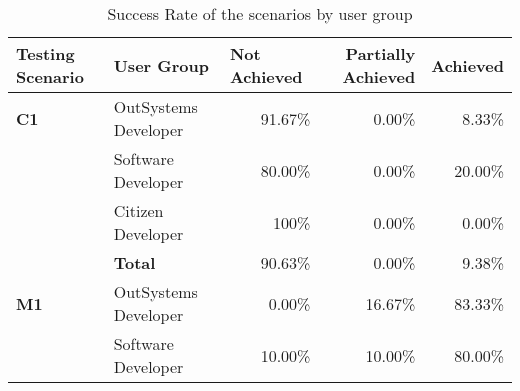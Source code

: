 \begin{table}[tb]
    \caption{Success Rate of the scenarios by user group}
    \label{tab:effectiveness_existing_interface}
    \begin{tabular}{@{}llrrr@{}}
    \toprule
    \rowcolor[HTML]{EFEFEF} 
    \textbf{Testing Scenario} & \textbf{User Group}  & \multicolumn{1}{l}{\cellcolor[HTML]{EFEFEF}\textbf{Not Achieved}} & \multicolumn{1}{C{2cm}}{\cellcolor[HTML]{EFEFEF}\textbf{Partially Achieved}} & \multicolumn{1}{l}{\cellcolor[HTML]{EFEFEF}\textbf{Achieved}} \\ \midrule
    \textbf{C1}               & OutSystems Developer & 91.67\%                                                           & 0.00\%                                                                  & 8.33\%                                                        \\
                              & Software Developer   & 80.00\%                                                           & 0.00\%                                                                  & 20.00\%                                                       \\
                              & Citizen Developer    & 100\%                                                             & 0.00\%                                                                  & 0.00\%                                                        \\
                              & \textbf{Total}       & 90.63\%                                                           & 0.00\%                                                                  & 9.38\%                                                        \\ \midrule
    \textbf{M1}               & OutSystems Developer & 0.00\%                                                            & 16.67\%                                                                 & 83.33\%                                                       \\
                              & Software Developer   & 10.00\%                                                           & 10.00\%                                                                 & 80.00\%                                                       \\

\end{tabular}
\end{table}
